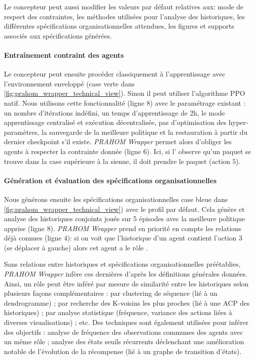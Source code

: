 \documentclass[demonstration]{jfsma}
\newcounter{relation}
\begin{document}
Le concepteur peut aussi modifier les valeurs par défaut relatives aux: mode de respect des contraintes, les méthodes utilisées pour l'analyse des historiques, les différentes spécifications organisationnelles attendues, les figures et supports associés aux spécifications générées.

\paragraph{Entraînement contraint des agents}

Le concepteur peut ensuite procéder classiquement à l'apprentissage avec l'environnement enveloppé (case verte dans \autoref{fig:prahom_wrapper_technical_view}). Sinon il peut utiliser l'algorithme PPO natif. Nous utilisons cette fonctionnalité (ligne 8) avec le paramétrage existant  : un nombre d'itérations indéfini, un temps d'apprentissage de 2h, le mode apprentissage centralisé et exécution décentralisée, pas d'optimisation des hyper-paramètres, la sauvegarde de la meilleure politique et la restauration à partir du dernier checkpoint s'il existe.
\emph{PRAHOM Wrapper} permet alors d'obliger les agents à respecter la contrainte donnée (ligne 6). Ici, si l' observe qu'un paquet se trouve dans la case supérieure à la sienne, il doit prendre le paquet (action $5$).

\paragraph{Génération et évaluation des spécifications organisationnelles }

Nous générons ensuite les spécifications organisationnelles case bleue dans \autoref{fig:prahom_wrapper_technical_view}) avec le profil par défaut. Cela génère et analyse des historiques conjoints joués sur 5 épisodes avec la meilleure politique apprise (ligne 8).
\emph{PRAHOM Wrapper} prend en priorité en compte les relations déjà connues (ligne 4): si on voit que l'historique d'un agent contient l'action $3$ (se déplacer à gauche) alors cet agent a le rôle .

Sans relations entre historiques et spécifications organisationnelles préétablies, \emph{PRAHOM Wrapper} infère ces dernières d'après les définitions générales données. Ainsi, un rôle peut être inféré par mesure de similarité entre les historiques selon plusieurs façons complémentaires : par clustering de séquence (lié à un dendrogramme) ; par recherche des K-voisins les plus proches (lié à une ACP des historiques) ; par analyse statistique (fréquence, variance des actions liées à diverses visualisations) ; etc.
Des techniques sont également utilisées pour inférer des objectifs : analyse de fréquence des observations communes des agents avec un même rôle ; analyse des états seuils récurrents déclenchant une amélioration notable de l'évolution de la récompense (lié à un graphe de transition d'états).
\end{document}
